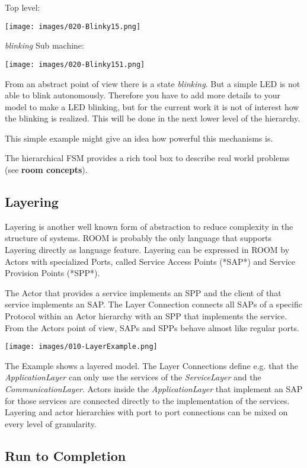 Top level:

\texttt{[image: images/020-Blinky15.png]}

\textit{blinking} Sub machine:

\texttt{[image: images/020-Blinky151.png]}

From an abstract point of view there is a state \textit{blinking}. But a simple LED is not able to blink autonomously. Therefore you have to add more details to your model to make a LED blinking, but for the current work it is not of interest how the blinking is realized. This will be done in the next lower level of the hierarchy. 

This simple example might give an idea how powerful this mechanisms is.

The hierarchical FSM provides a rich tool box to describe real world problems (see \textbf{room concepts}).

\subsection{Layering}

Layering is another well known form of abstraction to reduce complexity in the structure of systems. ROOM is probably the only language that supports Layering directly as language feature.
Layering can be expressed in ROOM by Actors with specialized Ports, called Service Access Points (*SAP*) and Service Provision Points (*SPP*).

The Actor that provides a service implements an SPP and the client of that service implements an SAP. The Layer Connection connects all SAPs of a specific Protocol within an Actor hierarchy with an SPP that implements the service. From the Actors point of view, SAPs and SPPs behave almost like regular ports.

\texttt{[image: images/010-LayerExample.png]}

The Example shows a layered model. The Layer Connections define e.g. that the \textit{ApplicationLayer} can only use the services of the \textit{ServiceLayer} and the \textit{CommunicationLayer}. Actors inside the \textit{ApplicationLayer} that implement an SAP for those services are connected directly to the implementation of the services. 
Layering and actor hierarchies with port to port connections can be mixed on every level of granularity. 

\subsection{Run to Completion}

